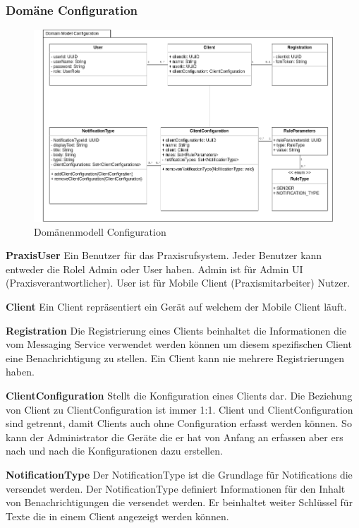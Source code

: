 \subsubsection*{Domäne Configuration}

\begin{figure}[h]
    \centering
    \begin{minipage}[b]{1.0\textwidth}
        \includegraphics[width=\textwidth]{graphics/Class_Configuration_Domain}
        \caption{Domänenmodell Configuration}
    \end{minipage}
\end{figure}

\textbf{PraxisUser}
Ein Benutzer für das Praxisrufsystem.
Jeder Benutzer kann entweder die Rolel Admin oder User haben.
Admin ist für Admin UI (Praxisverantwortlicher).
User ist für Mobile Client (Praxismitarbeiter) Nutzer.

\textbf{Client}
Ein Client repräsentiert ein Gerät auf welchem der Mobile Client läuft.

\textbf{Registration}
Die Registrierung eines Clients beinhaltet die Informationen die vom Messaging Service verwendet werden können um diesem spezifischen Client eine Benachrichtigung zu stellen.
Ein Client kann nie mehrere Registrierungen haben.

\textbf{ClientConfiguration}
Stellt die Konfiguration eines Clients dar.
Die Beziehung von Client zu ClientConfiguration ist immer 1:1.
Client und ClientConfiguration sind getrennt, damit Clients auch ohne Configuration erfasst werden können.
So kann der Administrator die Geräte die er hat von Anfang an erfassen aber ers nach und nach die Konfigurationen dazu erstellen.

\textbf{NotificationType}
Der NotificationType ist die Grundlage für Notifications die versendet werden.
Der NotificationType definiert Informationen für den Inhalt von Benachrichtigungen die versendet werden.
Er beinhaltet weiter Schlüssel für Texte die in einem Client angezeigt werden können.

